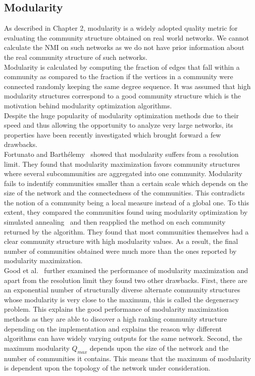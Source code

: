 \begin{spacing}{1.5}
\subsection{Modularity}
As described in Chapter 2, modularity is a widely adopted quality metric for evaluating the community structure obtained on real world networks. We cannot calculate the NMI on such networks as we do not have prior information about the real community structure of such networks.\\
\indent Modularity is calculated by computing the fraction of edges that fall within a community as compared to the fraction if the vertices in a community were connected randomly keeping the same degree sequence. It was assumed that high modularity structures correspond to a good community structure which is the motivation behind modularity optimization algorithms.\\ 
\indent Despite the huge popularity of modularity optimization methods due to their speed and thus allowing the opportunity to analyze very large networks, its properties have been recently investigated which brought forward a few drawbacks.\\
\indent Fortunato and Barth\'{e}lemy~\cite{Fortunato02012007} showed that modularity suffers from a resolution limit. They found that modularity maximization favors community structures where several subcommunities are aggregated into one community. Modularity fails to indentify communities smaller than a certain scale which depends on the size of the network and the connectedness of the communities. This contradicts the notion of a community being a local measure instead of a global one. To this extent, they compared the communities found using modularity optimization by simulated annealing~\cite{Guimera04simulatedAnnealingNetworks} and then reapplied the method on each community returned by the algorithm. They found that most communities themselves had a clear community structure with high modularity values. As a result, the final number of communities obtained were much more than the ones reported by modularity maximization.\\
\indent Good et al.~\cite{PhysRevE.81.046106} further examined the performance of modularity maximization and apart from the resolution limit they found two other drawbacks. First, there are an exponential number of structurally diverse alternate community structures whose modularity is very close to the maximum, this is called the degeneracy problem. This explains the good performance of modularity maximization methods as they are able to discover a high ranking community structure depending on the implementation and explains the reason why different algorithms can have widely varying outputs for the same network. Second, the maximum modularity $Q_{max}$ depends upon the size of the network and the number of communities it contains. This means that the maximum of modularity is dependent upon the topology of the network under consideration.\\

\end{spacing}
